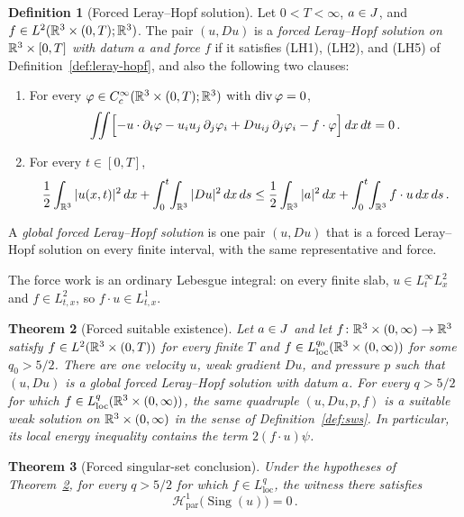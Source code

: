 \documentclass[11pt,letterpaper]{article}
\numberwithin{equation}{section}
\theoremstyle{plain}
\newtheorem{theorem}{Theorem}[section]
\theoremstyle{definition}
\newtheorem{definition}[theorem]{Definition}
\theoremstyle{remark}
\begin{document}
\begin{definition}[Forced Leray--Hopf solution]\label{def:forced-leray-hopf}
Let $0<T<\infty$, $a\in J$, and
$f\in L^2(\mathbb{R}^3\times(0,T);\mathbb{R}^3)$. The pair $(u,Du)$ is a
\emph{forced Leray--Hopf solution on $\mathbb{R}^3\times[0,T]$ with datum $a$ and
force $f$} if it satisfies (LH1), (LH2), and (LH5) of
Definition~\ref{def:leray-hopf}, and also the following two clauses:
\begin{enumerate}[label=(FLH\arabic*)]
\item For every $\varphi\in C_c^\infty(\mathbb{R}^3\times(0,T);\mathbb{R}^3)$ with
  $\operatorname{div}\varphi=0$,
  \[
  \iint\Bigl[-u\cdot\partial_t\varphi-u_i u_j\,\partial_j\varphi_i
       +Du_{ij}\,\partial_j\varphi_i-f\cdot\varphi\Bigr]\,dx\,dt=0\,.
  \]
\item For every $t\in[0,T]$,
  \[
  \frac12\int_{\mathbb{R}^3}|u(x,t)|^2\,dx
  +\int_0^t\!\int_{\mathbb{R}^3}|Du|^2\,dx\,ds
  \le\frac12\int_{\mathbb{R}^3}|a|^2\,dx
  +\int_0^t\!\int_{\mathbb{R}^3}f\cdot u\,dx\,ds\,.
  \]
\end{enumerate}
A \emph{global forced Leray--Hopf solution} is one pair $(u,Du)$ that is
a forced Leray--Hopf solution on every finite interval, with the same
representative and force.
\end{definition}

The force work is an ordinary Lebesgue integral: on every finite slab,
$u\in L^\infty_tL^2_x$ and $f\in L^2_{t,x}$, so $f\cdot u\in L^1_{t,x}$.

\begin{theorem}[Forced suitable existence]\label{thm:leray-forced}
Let $a\in J$ and let $f\colon\mathbb{R}^3\times(0,\infty)\to\mathbb{R}^3$ satisfy
$f\in L^2(\mathbb{R}^3\times(0,T))$ for every finite $T$ and
$f\in L^{q_0}_{\mathrm{loc}}(\mathbb{R}^3\times(0,\infty))$ for some
$q_0>5/2$. There are one velocity $u$, weak gradient $Du$, and pressure
$p$ such that $(u,Du)$ is a global forced Leray--Hopf solution with datum
$a$. For every $q>5/2$ for which
$f\in L^q_{\mathrm{loc}}(\mathbb{R}^3\times(0,\infty))$, the same quadruple
$(u,Du,p,f)$ is a suitable weak solution on
$\mathbb{R}^3\times(0,\infty)$ in the sense of
Definition~\ref{def:sws}. In particular, its local energy inequality
contains the term $2(f\cdot u)\psi$.
\end{theorem}

\begin{theorem}[Forced singular-set conclusion]
\label{thm:leray-forced-singularSet}
Under the hypotheses of Theorem~\ref{thm:leray-forced}, for every
$q>5/2$ for which $f\in L^q_{\mathrm{loc}}$, the witness there satisfies
\[
 \mathcal H^1_{\mathrm{par}}\bigl(\operatorname{Sing}(u)\bigr)=0\,.
\]
\end{theorem}
\end{document}
